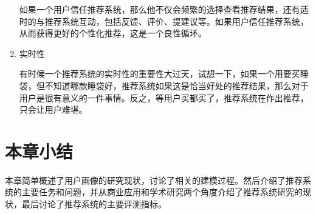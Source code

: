 \begin{enumerate}[(1)]
			如果一个用户信任推荐系统，那么他不仅会频繁的选择查看推荐结果，还有适时的与推荐系统互动，包括反馈、评价、提建议等。如果用户信任推荐系统，从而获得更好的个性化推荐，这是一个良性循环。
			\item 实时性

			有时候一个推荐系统的实时性的重要性大过天，试想一下，如果一个用要买睡袋，但不知道哪款睡袋好，推荐系统如果这是恰当好处的推荐结果，那么对于用户是很有意义的一件事情。反之，等用户买都买了，推荐系统在作出推荐，只会让用户难堪。
			\end{enumerate}

	\section{本章小结}
	本章简单概述了用户画像的研究现状，讨论了相关的建模过程。然后介绍了推荐系统的主要任务和问题，并从商业应用和学术研究两个角度介绍了推荐系统研究的现状，最后讨论了推荐系统的主要评测指标。
